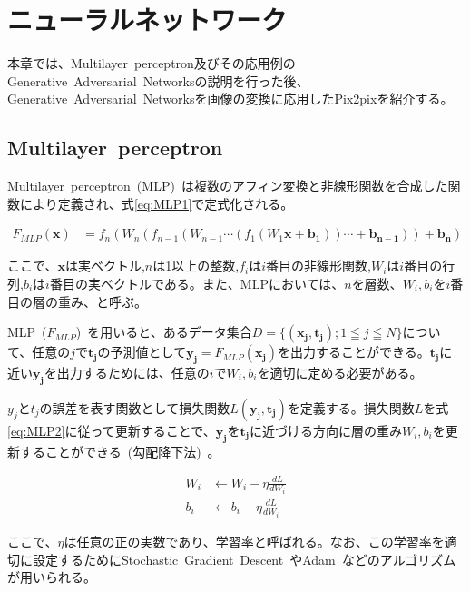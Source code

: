 \chapter{ニューラルネットワーク}

本章では、Multilayer~perceptron及びその応用例のGenerative~Adversarial~Networksの説明を行った後、Generative~Adversarial~Networksを画像の変換に応用したPix2pixを紹介する。

\section{Multilayer~perceptron}


Multilayer~perceptron~(MLP)~は複数のアフィン変換と非線形関数を合成した関数により定義され、式\ref{eq:MLP1}で定式化される。

\begin{align}
    \label{eq:MLP1}
    F_{MLP}(\boldsymbol{x})&=f_{n}(W_{n}(f_{n-1}(W_{n-1}\cdots(f_{1}(W_{1}\boldsymbol{x}+\boldsymbol{b_{1}}))\cdots+\boldsymbol{b_{n-1}}))+\boldsymbol{b_{n}})
\end{align}

ここで、$\boldsymbol{x}$は実ベクトル,$n$は1以上の整数,$f_{i}$は$i$番目の非線形関数,$W_{i}$は$i$番目の行列,$b_{i}$は$i$番目の実ベクトルである。また、MLPにおいては、$n$を層数、$W_i,b_i$を$i$番目の層の重み、と呼ぶ。

MLP~($F_{MLP}$)~を用いると、あるデータ集合$D=\{(\boldsymbol{x_j},\boldsymbol{t_j}); 1 \leqq j \leqq N\}$について、任意の$j$で$\boldsymbol{t_{j}}$の予測値として$\boldsymbol{y_j}=F_{MLP}(\boldsymbol{x_j})$を出力することができる。$\boldsymbol{t_j}$に近い$\boldsymbol{y_j}$を出力するためには、任意の$i$で$W_i,b_i$を適切に定める必要がある。

$y_j$と$t_j$の誤差を表す関数として損失関数$L(\boldsymbol{y_j},\boldsymbol{t_j})$を定義する。損失関数$L$を式\ref{eq:MLP2}に従って更新することで、$\boldsymbol{y_j}$を$\boldsymbol{t_j}$に近づける方向に層の重み$W_i,b_i$を更新することができる~(勾配降下法)~。

\begin{align}
    \label{eq:MLP2}
    W _i &\leftarrow W_i - \eta \frac{d L}{dW_i} \\
    b _i &\leftarrow b_i - \eta \frac{d L}{dW_i}
\end{align}

ここで、$\eta$は任意の正の実数であり、学習率と呼ばれる。なお、この学習率を適切に設定するためにStochastic~Gradient~Descent~\cite{SGD}やAdam~\cite{Adam}などのアルゴリズムが用いられる。

